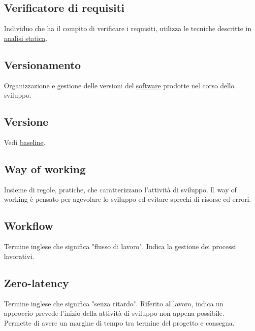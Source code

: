 	\subsection{Verificatore di requisiti}
	\label{sec:verificatorerequisiti}
	Individuo che ha il compito di verificare i requisiti, utilizza le tecniche descritte in \underline{\hyperref[sec:analisistatica]{analisi statica}}.

	\subsection{Versionamento}
	\label{sec:versionamento}
	Organizzazione e gestione delle versioni del \underline{\hyperref[sec:prodottosoftware]{software}} prodotte nel corso dello sviluppo.

	\subsection{Versione}
	\label{sec:versione}
	Vedi \underline{\hyperref[sec:baseline]{baseline}}. \newpage

	\subsection{Way of working}
	\label{sec:wow}
	Insieme di regole, pratiche, che caratterizzano l'attività di sviluppo. Il way of working è pensato per agevolare lo sviluppo ed evitare sprechi di risorse ed errori.

	\subsection{Workflow}
	\label{sec:workflow}
	Termine inglese che significa "flusso di lavoro". Indica la gestione dei processi lavorativi.

	 \newpage



	\subsection{Zero-latency}
	\label{sec:zerolatency}
	Termine inglese che significa "senza ritardo". Riferito al lavoro, indica un approccio prevede l'inizio della attività di sviluppo non appena possibile. Permette di avere un margine di tempo tra termine del progetto e consegna.

